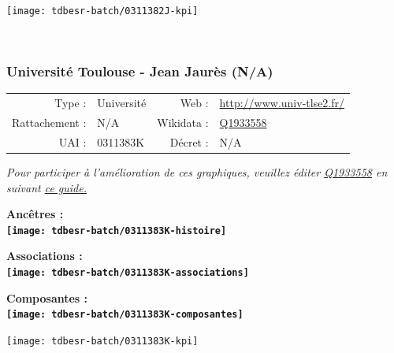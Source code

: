 \documentclass[12pt,french,]{article}
\begin{document}
\begin{center}\texttt{[image: tdbesr-batch/0311382J-kpi]} \end{center}\checkoddpage

\ifoddpage ~\newpage \fi   

\hypertarget{universituxe9-toulouse---jean-jauruxe8s-na}{%
\subsubsection{Université Toulouse - Jean Jaurès
(N/A)}\label{universituxe9-toulouse---jean-jauruxe8s-na}}

\begin{tabular*}{\textwidth}{rp{5cm}rl}  
\hline  
Type : & Université & Web : &\href{http://www.univ-tlse2.fr/}{http://www.univ-tlse2.fr/} \\  
Rattachement : & N/A & Wikidata : & \href{https://www.wikidata.org/entity/Q1933558}{Q1933558} \\  
UAI : & 0311383K & Décret : & N/A \\  
\hline  
\end{tabular*}

\textit{\scriptsize Pour participer à l'amélioration de ces graphiques, veuillez éditer  \href{https://www.wikidata.org/entity/Q1933558}{Q1933558}  en suivant \href{https://github.com/cpesr/wikidataESR/blob/master/Rmd/wikidataESR.md}{ce guide.}}

\vspace{1cm}  
\begin{minipage}[b]{0.50\textwidth}\begin{center} \bf Ancêtres : \\  
\texttt{[image: tdbesr-batch/0311383K-histoire]} \end{center}\end{minipage}\begin{minipage}[b]{0.50\textwidth}\begin{center} \bf Associations : \\  
\texttt{[image: tdbesr-batch/0311383K-associations]} \end{center}\end{minipage}

\hrulefill

\begin{center} \bf Composantes : \\  
\texttt{[image: tdbesr-batch/0311383K-composantes]} \end{center}

\begin{center}\texttt{[image: tdbesr-batch/0311383K-kpi]} \end{center}\checkoddpage
\end{document}
